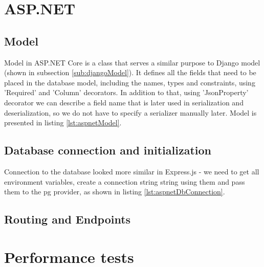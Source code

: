 %
%
\section{ASP.NET}
\subsection{Model}
Model in ASP.NET Core is a class that serves a similar purpose to Django model (shown in subsection \ref{sub:djangoModel}). It defines all the fields that need to be placed in the database model, including the names, types and constraints, using 'Required' and 'Column' decorators. In addition to that, using 'JsonProperty' decorator we can describe a field name that is later used in serialization and deserialization, so we do not have to specify a serializer manually later. Model is presented in listing \ref{lst:aspnetModel}.

\subsection{Database connection and initialization}
Connection to the database looked more similar in Express.js - we need to get all environment variables, create a connection string string using them and pass them to the \acrlong{pg} provider, as shown in listing \ref{lst:aspnetDbConnection}.


\subsection{Routing and Endpoints}



%
%
\section{Performance tests}
